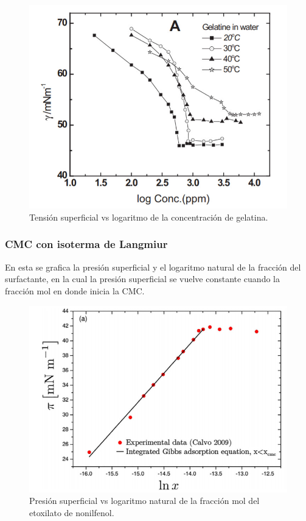 \documentclass[10pt]{report}
\begin{document}
    \begin{figure}[h!]
        \centering
        \includegraphics[scale=0.5]{./log2.jpg}
        \caption{Tensión superficial vs logaritmo de la concentración de gelatina.\cite{art:log2}}
    \end{figure}

    \subsubsection*{CMC con isoterma de Langmiur}

    En esta se grafica la presión superficial y el logaritmo natural de la fracción del surfactante, en la cual la presión superficial se vuelve constante cuando la fracción mol en donde inicia la CMC.

    \begin{figure}[h!]
        \centering
        \includegraphics[scale=0.5]{./iso1.jpg}
        \caption{Presión superficial vs logaritmo natural de la fracción mol del etoxilato de nonilfenol.\cite{art:iso1}}
    \end{figure}
\end{document}
